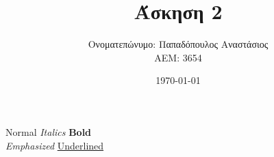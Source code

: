 \documentclass{article}
\title{Άσκηση 2}
\author{Ονοματεπώνυμο: Παπαδόπουλος Αναστάσιος \\ 
        ΑΕΜ: 3654}
\date{\today}
\begin{document}
\maketitle 

\begin{center}
        \vspace{5mm}
        \Huge \textlatin{Normal} \textit{\textlatin{Italics}} \textbf{\textlatin{Bold}} \\
        \Huge \emph{\textlatin{Emphasized}} \underline{\textlatin{Underlined}}
\end{center}
\end{document}
